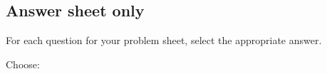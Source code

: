 \documentclass[
  english,
  ]{sdapsclassic}
\begin{document}
\begin{questionnaire}[noinfo]
\begin{Form}
    \section{Answer sheet only}
    \begin{info}
      For each question for your problem sheet, select the appropriate answer.
    \end{info}

    \begin{choicegroup}[singlechoice]{Choose:}

    \end{choicegroup}

  \end{Form}
  \end{questionnaire}
\end{document}
